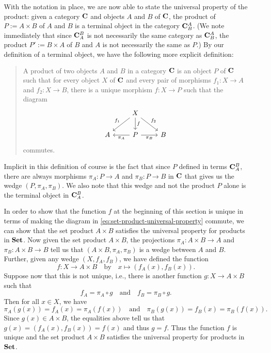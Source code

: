 \begin{example}
    With the notation in place, we are now able to state the universal property
    of the product: given a category \(\mathbf{C}\) and objects \(A\) and \(B\) of
    \(\mathbf{C}\), the product of \(P:= A \times B\) of \(A\) and \(B\) is a
    terminal object in the category \(\mathbf{C}^A_B\). (We note immediately that
    since \(\mathbf{C}_A^B\) is not necessarily the same category as
    \(\mathbf{C}_B^A\), the product \(P' := B \times A\) of \(B\) and \(A\) is not
    necessarily the same as \(P\).) By our definition of a terminal object, we
    have the following more explicit definition:
          \begin{quotation}
            A product of two objects \(A\) and \(B\) in a category \(\mathbf{C}\)
            is an object \(P\) of \(\mathbf{C}\) such that for every object \(X\)
            of \(\mathbf{C}\) and every pair of morphisms \(f_1: X \to A\) and
            \(f_2: X \to B\), there is a unique morphism \(f: X \to P\) such
            that the diagram
            \[
                \begin{tikzcd}
                    & X \arrow[ld, "f_1"'] \arrow[rd, "f_2"] \arrow[d, "f"] &   \\
                  A & P \arrow[r, "\pi_B"'] \arrow[l, "\pi_A"]     & B
                  \end{tikzcd}
            \]
            commutes.
          \end{quotation}
    Implicit in this definition of course is the fact that since \(P\) defined
    in terms \(\mathbf{C}_A^B\), there are always morphisms \(\pi_A: P \to A\) and
    \(\pi_B: P \to B\) in \(\mathbf{C}\) that gives us the wedge \((P, \pi_A,
    \pi_B)\). We also note that this wedge and not the product \(P\) alone is
    the terminal object in \(\mathbf{C}_A^B\).

    In order to show that the function \(f\) at the beginning of this section is
    unique in terms of making the diagram in
    \eqref{eq:set-product-universal-property} commute, we can show that the set
    product \(A \times B\) satisfies the universal property for products in
    \(\mathbf{Set}\). Now given the set product \(A \times B\), the projections \(\pi_A:
    A \times B \to A\) and \(\pi_B: A \times B \to B\) tell us that \((A \times
    B, \pi_A, \pi_B)\) is a wedge between \(A\) and \(B\). Further, given any
    wedge \((X, f_A, f_B)\), we have defined the function
    \[
          f: X \to A \times B \quad \text{by} \quad x \mapsto (f_A(x), f_B(x)).
    \]
    Suppose now that this is not unique, i.e., there is another function \(g: X
    \to A \times B\) such that
    \[
        f_A = \pi_A \circ g \quad \text{and} \quad f_B = \pi_B \circ g.
    \]
    Then for all \(x \in X\), we have
    \[
        \pi_A(g(x)) = f_A(x) = \pi_A(f(x)) \quad \text{and} \quad \pi_B(g(x)) = f_B(x) = \pi_B(f(x)).
    \]
    Since \(g(x) \in A \times B\), the equalities above tell us that \(g(x) =
    (f_A(x), f_B(x)) = f(x)\) and thus \(g = f\). Thus the function \(f\) is
    unique and the set product \(A \times B\) satisfies the universal property
    for products in \(\mathbf{Set}\).
\end{example}